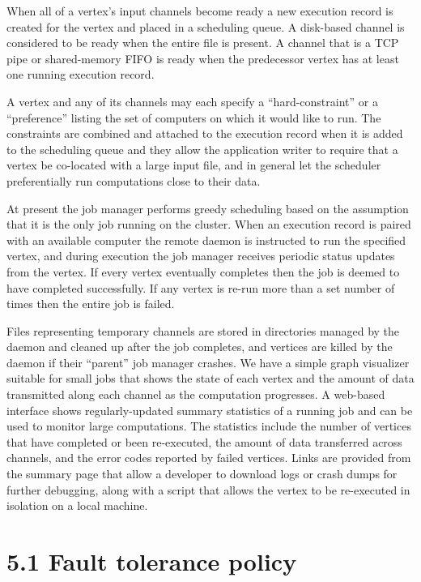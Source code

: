 \documentclass[
]{article}
\begin{document}
When all of a vertex's input channels become ready a new execution
record is created for the vertex and placed in a scheduling queue. A
disk-based channel is considered to be ready when the entire file is
present. A channel that is a TCP pipe or shared-memory FIFO is ready
when the predecessor vertex has at least one running execution record.

A vertex and any of its channels may each specify a ``hard-constraint''
or a ``preference'' listing the set of computers on which it would like
to run. The constraints are combined and attached to the execution
record when it is added to the scheduling queue and they allow the
application writer to require that a vertex be co-located with a large
input file, and in general let the scheduler preferentially run
computations close to their data.

At present the job manager performs greedy scheduling based on the
assumption that it is the only job running on the cluster. When an
execution record is paired with an available computer the remote daemon
is instructed to run the specified vertex, and during execution the job
manager receives periodic status updates from the vertex. If every
vertex eventually completes then the job is deemed to have completed
successfully. If any vertex is re-run more than a set number of times
then the entire job is failed.

Files representing temporary channels are stored in directories managed
by the daemon and cleaned up after the job completes, and vertices are
killed by the daemon if their ``parent'' job manager crashes. We have a
simple graph visualizer suitable for small jobs that shows the state of
each vertex and the amount of data transmitted along each channel as the
computation progresses. A web-based interface shows regularly-updated
summary statistics of a running job and can be used to monitor large
computations. The statistics include the number of vertices that have
completed or been re-executed, the amount of data transferred across
channels, and the error codes reported by failed vertices. Links are
provided from the summary page that allow a developer to download logs
or crash dumps for further debugging, along with a script that allows
the vertex to be re-executed in isolation on a local machine.

\section{5.1 Fault tolerance policy}\label{fault-tolerance-policy}
\end{document}

